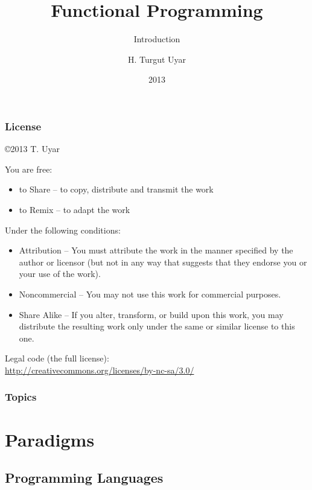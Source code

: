 \documentclass[dvipsnames]{beamer}
\title{Functional Programming}
\subtitle{Introduction}
\author{H. Turgut Uyar}
\date{2013}
\theoremstyle{plain}
\begin{document}
\begin{frame}
  \titlepage
\end{frame}

\begin{frame}
  \frametitle{License}

  \hfill
  \copyright 2013 T. Uyar

  \vfill
  \begin{tiny}
    You are free:
    \begin{itemize}
      \item to Share -- to copy, distribute and transmit the work
      \item to Remix -- to adapt the work
    \end{itemize}

    Under the following conditions:
    \begin{itemize}
      \item Attribution -- You must attribute the work in the manner specified by
        the author or licensor (but not in any way that suggests that they
        endorse you or your use of the work).

      \item Noncommercial -- You may not use this work for commercial purposes.

      \item Share Alike -- If you alter, transform, or build upon this work, you
        may distribute the resulting work only under the same or similar license
        to this one.
    \end{itemize}
  \end{tiny}

  \vfill
  Legal code (the full license):\\
  \url{http://creativecommons.org/licenses/by-nc-sa/3.0/}
\end{frame}

\begin{frame}
  \frametitle{Topics}
  \tableofcontents
\end{frame}

\section{Paradigms}

\subsection{Programming Languages}
\end{document}
